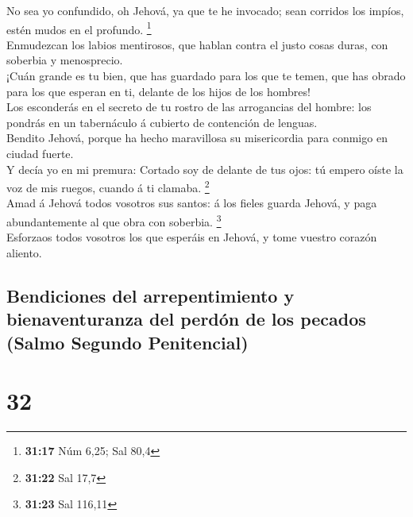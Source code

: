  No sea yo confundido, oh Jehová, ya que te he invocado;
sean corridos los impíos, estén mudos en el profundo. \footnote{\textbf{31:17}
  Núm 6,25; Sal 80,4}\\
 Enmudezcan los labios mentirosos, que hablan contra el
justo cosas duras, con soberbia y menosprecio.\\
 ¡Cuán grande es tu bien, que has guardado para los que te
temen, que has obrado para los que esperan en ti, delante de los hijos
de los hombres!\\
 Los esconderás en el secreto de tu rostro de las
arrogancias del hombre: los pondrás en un tabernáculo á cubierto de
contención de lenguas.\\
 Bendito Jehová, porque ha hecho maravillosa su
misericordia para conmigo en ciudad fuerte.\\
 Y decía yo en mi premura: Cortado soy de delante de tus
ojos: tú empero oíste la voz de mis ruegos, cuando á ti clamaba.
\footnote{\textbf{31:22} Sal 17,7}\\
 Amad á Jehová todos vosotros sus santos: á los fieles
guarda Jehová, y paga abundantemente al que obra con soberbia.
\footnote{\textbf{31:23} Sal 116,11}\\
 Esforzaos todos vosotros los que esperáis en Jehová, y
tome vuestro corazón aliento.

\hypertarget{bendiciones-del-arrepentimiento-y-bienaventuranza-del-perduxf3n-de-los-pecados-salmo-segundo-penitencial}{%
\subsection{Bendiciones del arrepentimiento y bienaventuranza del perdón
de los pecados (Salmo Segundo
Penitencial)}\label{bendiciones-del-arrepentimiento-y-bienaventuranza-del-perduxf3n-de-los-pecados-salmo-segundo-penitencial}}

\hypertarget{section-31}{%
\section{32}\label{section-31}}

